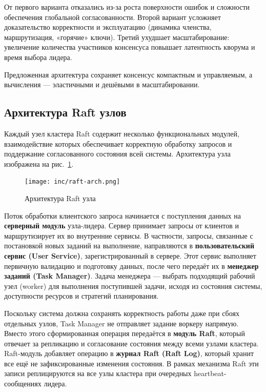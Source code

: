 От первого варианта отказались из-за роста поверхности ошибок и сложности
обеспечения глобальной согласованности. Второй вариант усложняет доказательство
корректности и эксплуатацию (динамика членства, маршрутизация, «горячие»
ключи). Третий ухудшает масштабирование: увеличение количества участников
консенсуса повышает латентность кворума и время выбора лидера.

Предложенная архитектура сохраняет консенсус компактным и управляемым, а
вычисления — эластичными и дешёвыми в масштабировании.

\subsection{Архитектура Raft узлов}

Каждый узел кластера Raft содержит несколько функциональных модулей,
взаимодействие которых обеспечивает корректную обработку запросов и поддержание
согласованного состояния всей системы. Архитектура узла изображена на
рис.~\ref{fig:arch-overview}.

\begin{figure}
  \centering
  \texttt{[image: inc/raft-arch.png]}
  \caption{Архитектура Raft узла}
  \label{fig:arch-overview}
\end{figure}

Поток обработки клиентского запроса начинается с поступления данных на
\textbf{серверный модуль} узла-лидера. Сервер принимает запросы от клиентов и
маршрутизирует их во внутренние сервисы. В частности, запросы, связанные с
постановкой новых заданий на выполнение, направляются в
\textbf{пользовательский сервис (User Service)}, зарегистрированный в сервере.
Этот сервис выполняет первичную валидацию и подготовку данных, после чего
передаёт их в \textbf{менеджер заданий (Task Manager)}. Задача менеджера —
выбрать подходящий рабочий узел (worker) для выполнения поступившей задачи,
исходя из состояния системы, доступности ресурсов и стратегий планирования.

Поскольку система должна сохранять корректность работы даже при сбоях
отдельных узлов, Task Manager не отправляет задание воркеру напрямую.
Вместо этого сформированная операция передаётся в
\textbf{модуль Raft}, который отвечает за репликацию и согласование
состояния между всеми узлами кластера. Raft-модуль добавляет операцию
в \textbf{журнал Raft (Raft Log)}, который хранит все ещё не
зафиксированные изменения состояния. В рамках механизма Raft эти записи
реплицируются на все узлы кластера при очередных heartbeat-сообщениях
лидера.


